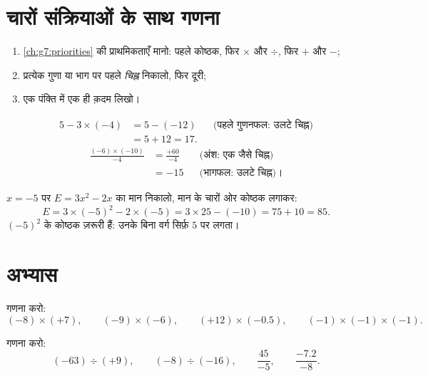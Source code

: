 \section{चारों संक्रियाओं के साथ गणना}

\begin{method}[सापेक्ष संख्याओं के साथ पक्की गणना]\label{met:g8:negprod:compute}
\begin{enumerate}
  \item \cref{ch:g7:priorities} की प्राथमिकताएँ मानो: पहले कोष्ठक,
        फिर $\times$ और $\div$, फिर $+$ और $-$;
  \item प्रत्येक गुणा या भाग पर पहले \emph{चिह्न} निकालो, फिर दूरी;
  \item एक पंक्ति में एक ही क़दम लिखो।
\end{enumerate}
\end{method}

\begin{example}\label{ex:g8:negprod:compute}
\begin{align*}
5 - 3 \times (-4)
&= 5 - (-12) && \text{(पहले गुणनफल: उलटे चिह्न)}\\
&= 5 + 12 = 17 .
\end{align*}
\begin{align*}
\frac{(-6) \times (-10)}{-4}
&= \frac{+60}{-4} && \text{(अंश: एक जैसे चिह्न)}\\
&= -15 && \text{(भागफल: उलटे चिह्न)।}
\end{align*}
\end{example}

\begin{example}[ऋण मान रखना]\label{ex:g8:negprod:substitute}
$x = -5$ पर $E = 3x^2 - 2x$ का मान निकालो, मान के चारों ओर कोष्ठक लगाकर:
\[
E = 3 \times (-5)^2 - 2 \times (-5)
= 3 \times 25 - (-10)
= 75 + 10 = 85 .
\]
$(-5)^2$ के कोष्ठक ज़रूरी हैं: उनके बिना वर्ग सिर्फ़ $5$ पर लगता।
\end{example}

\section{अभ्यास}

\begin{exercise}[$\star$]\label{exo:g8:negprod:1}
गणना करो:
\[
(-8) \times (+7), \qquad
(-9) \times (-6), \qquad
(+12) \times (-0.5), \qquad
(-1) \times (-1) \times (-1).
\]
\end{exercise}

\begin{exercise}[$\star$]\label{exo:g8:negprod:2}
गणना करो:
\[
(-63) \div (+9), \qquad
(-8) \div (-16), \qquad
\frac{45}{-5}, \qquad
\frac{-7.2}{-8} .
\]
\end{exercise}

